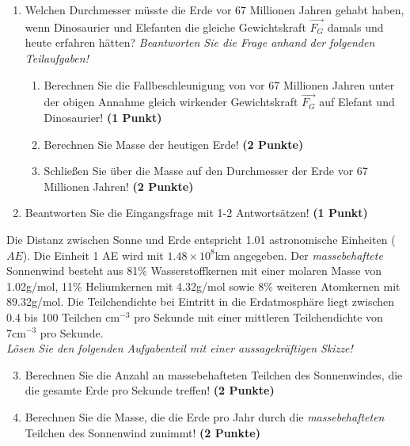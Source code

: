 \documentclass[a4paper, 9pt]{scrartcl}\usepackage[]{graphicx}\usepackage[]{xcolor}
\begin{document}
\begin{enumerate}
\item Welchen Durchmesser müsste die Erde vor 67 Millionen Jahren gehabt haben, wenn Dinosaurier und Elefanten die gleiche Gewichtskraft $\overrightarrow{F_G}$ damals und heute erfahren hätten? \textit{Beantworten Sie die Frage anhand der folgenden Teilaufgaben!}
\begin{enumerate}
\item Berechnen Sie die Fallbeschleunigung von vor 67 Millionen Jahren unter der obigen Annahme gleich wirkender Gewichtskraft $\overrightarrow{F_G}$ auf Elefant und Dinosaurier! \textbf{(1 Punkt)}
\item Berechnen Sie Masse der heutigen Erde! \textbf{(2 Punkte)}
\item Schließen Sie über die Masse auf den Durchmesser der Erde vor 67 Millionen Jahren! \textbf{(2 Punkte)}
\end{enumerate}
\item Beantworten Sie die Eingangsfrage mit 1-2 Antwortsätzen! \textbf{(1 Punkt)}
\end{enumerate}

Die Distanz zwischen Sonne und Erde entspricht 1.01 astronomische Einheiten ($AE$). Die Einheit 1 AE wird mit \ensuremath{1.48\times 10^{8}}km angegeben. Der \textit{massebehaftete} Sonnenwind besteht aus 81\% Wasserstoffkernen mit einer molaren Masse von 1.02g/mol, 11\% Heliumkernen mit 4.32g/mol sowie 8\% weiteren Atomkernen mit  89.32g/mol. Die Teilchendichte bei Eintritt in die Erdatmosphäre liegt zwischen 0.4 bis 100 Teilchen cm$^{-3}$ pro Sekunde mit einer mittleren Teilchendichte von 7cm$^{-3}$ pro Sekunde. \\

\textit{Lösen Sie den folgenden Aufgabenteil mit einer aussagekräftigen Skizze!}

\begin{enumerate}
  \setcounter{enumi}{2}
\item Berechnen Sie die Anzahl an massebehafteten Teilchen des Sonnenwindes, die die gesamte Erde pro Sekunde treffen! \textbf{(2 Punkte)}
\item Berechnen Sie die Masse, die die Erde pro Jahr durch die \textit{massebehafteten} Teilchen des Sonnenwind zunimmt! \textbf{(2 Punkte)}
\end{enumerate}
\end{document}
